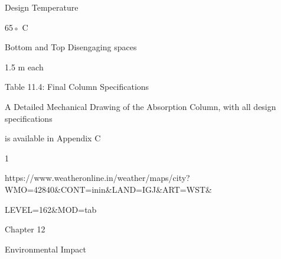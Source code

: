 \documentclass[a4paper,portrait,12pt]{article}
\begin{document}
\begin{flushleft}
Design Temperature
\end{flushleft}





\begin{flushleft}
65◦ C
\end{flushleft}





\begin{flushleft}
Bottom and Top Disengaging spaces
\end{flushleft}





\begin{flushleft}
1.5 m each
\end{flushleft}





\begin{flushleft}
Table 11.4: Final Column Specifications
\end{flushleft}





\begin{flushleft}
A Detailed Mechanical Drawing of the Absorption Column, with all design specifications
\end{flushleft}


\begin{flushleft}
is available in Appendix C
\end{flushleft}


1


\begin{flushleft}
https://www.weatheronline.in/weather/maps/city?WMO=42840\&CONT=inin\&LAND=IGJ\&ART=WST\&
\end{flushleft}


\begin{flushleft}
LEVEL=162\&MOD=tab
\end{flushleft}





\begin{flushleft}
\newpage
Chapter 12
\end{flushleft}





\begin{flushleft}
Environmental Impact
\end{flushleft}
\end{document}
